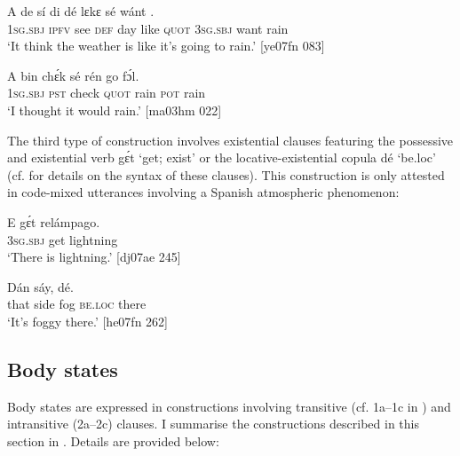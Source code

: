 \ea%
    \label{ex:key:1245}
    \gll A    de  sí  di  dé  lɛkɛ  sé        wánt  .\\
\textsc{1sg.sbj}  \textsc{ipfv}  see  \textsc{def}  day  like  \textsc{quot}    \textsc{3sg.sbj}  want  rain\\

\glt ‘It think the weather is like it’s going to rain.’ [ye07fn 083]
\z


\ea%
    \label{ex:key:1246}
    \gll A    bin  chɛ́k  sé    rén  go  fɔ́l.\\
\textsc{1sg.sbj}  \textsc{pst}  check  \textsc{quot}    rain  \textsc{pot}  rain\\

\glt ‘I thought it would rain.’ [ma03hm 022]
\z

The third type of construction involves existential clauses featuring the possessive and existential verb gɛ́t ‘get; exist’ or the locative-existential copula dé ‘be.loc’ (cf.  for details on the syntax of these clauses). This construction is only attested in code-mixed utterances involving a Spanish atmospheric phenomenon: 


\ea%
    \label{ex:key:1247}
    \gll E    gɛ́t  relámpago.\\
\textsc{3sg.sbj}  get  lightning\\

\glt ‘There is lightning.’ [dj07ae 245]
\z


\ea%
    \label{ex:key:1248}
    \gll Dán  sáy,        dé.\\
that  side  fog    \textsc{be.loc}  there\\

\glt ‘It’s foggy there.’ [he07fn 262]
\z

\subsection{Body states}\label{sec:9.3.8}

Body states are expressed in constructions involving transitive (cf. 1a–1c in ) and intransitive (2a–2c) clauses. I summarise the constructions described in this section in . Details are provided below:

